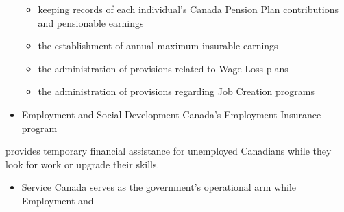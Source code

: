 \documentclass[letterpaper,10pt,english]{sphinxmanual}
\begin{document}
\begin{itemize}
\begin{itemize}
\item {} 
\sphinxAtStartPar
keeping records of each individual’s Canada Pension Plan contributions and pensionable earnings

\item {} 
\sphinxAtStartPar
the establishment of annual maximum insurable earnings

\item {} 
\sphinxAtStartPar
the administration of provisions related to Wage Loss plans

\item {} 
\sphinxAtStartPar
the administration of provisions regarding Job Creation programs

\end{itemize}

\item {} 
\sphinxAtStartPar
Employment and Social Development Canada’s Employment Insurance program

\end{itemize}

\sphinxAtStartPar
provides temporary financial assistance for unemployed Canadians while they look
for work or upgrade their skills.
\begin{itemize}
\item {} 
\sphinxAtStartPar
Service Canada serves as the government’s operational arm while Employment and

\end{itemize}
\end{document}
